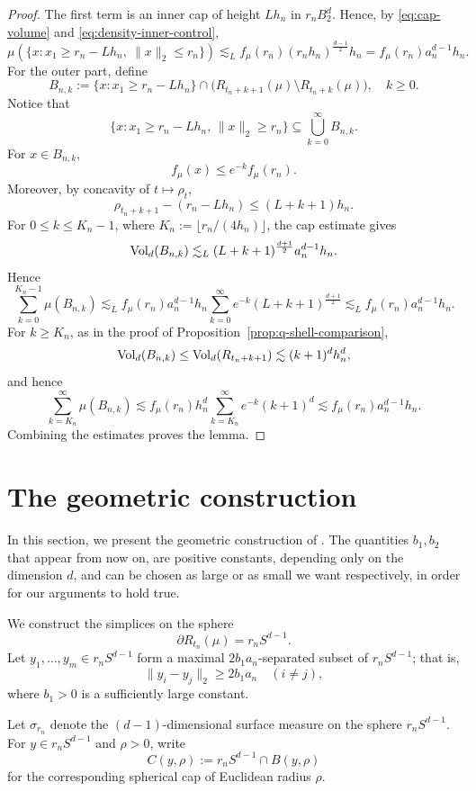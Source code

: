 \documentclass[10pt]{amsart}
\newcommand{\1}{\textbf{1}}
\newcommand{\vol}{{\rm Vol}}
\numberwithin{equation}{section} %
\theoremstyle{remark}
\theoremstyle{definition}
\begin{document}
\begin{proof}
The first term is an inner cap of height \(Lh_n\) in \(r_nB_2^d\). Hence, by \eqref{eq:cap-volume} and \eqref{eq:density-inner-control},
\[
\mu(\{x:x_1\ge r_n-Lh_n,\ \|x\|_2\le r_n\})
\lesssim_L
f_\mu(r_n)(r_nh_n)^{\frac{d-1}{2}}h_n
=
f_\mu(r_n)a_n^{d-1}h_n.
\]
For the outer part, define
\[
B_{n,k}:=
\{x:x_1\ge r_n-Lh_n\}
\cap
\bigl(R_{t_n+k+1}(\mu)\setminus R_{t_n+k}(\mu)\bigr),
\quad k\ge0.
\]
Notice that 
\[
\{x: x_1\geq r_n-L h_n, \, \|x\|_2 \geq r_n\} \subseteq \bigcup_{k=0}^{\infty} B_{n,k}.
\]
For \(x\in B_{n,k}\),
\[
f_\mu(x)\le e^{-k}f_\mu(r_n).
\]
Moreover, by concavity of \(t\mapsto\rho_t\),
\[
\rho_{t_n+k+1}-(r_n-Lh_n)
\le
(L+k+1)h_n.
\]
For $0\le k\le K_n-1$, where $K_n:=\lfloor r_n/(4h_n)\rfloor$, the cap estimate gives
\[
\vol_d(B_{n,k})
\lesssim_L
(L+k+1)^{\frac{d+1}{2}}a_n^{d-1}h_n.
\]
Hence
\[
\sum_{k=0}^{K_n-1}\mu(B_{n,k})
\lesssim_L
f_\mu(r_n)a_n^{d-1}h_n
\sum_{k=0}^{\infty}e^{-k}(L+k+1)^{\frac{d+1}{2}}
\lesssim_L
f_\mu(r_n)a_n^{d-1}h_n.
\]
For \(k \geq K_n\), as in the proof of Proposition~\ref{prop:q-shell-comparison},
\[
\vol_d(B_{n,k}) \leq \vol_d(R_{t_{n}+k+1})
\lesssim
(k+1)^dh_n^d,
\]
and hence
\[
\sum_{k=K_n}^{\infty}\mu(B_{n,k})
\lesssim
f_\mu(r_n)h_n^d\sum_{k=K_n}^{\infty}e^{-k}(k+1)^d \lesssim f_\mu(r_n)a_n^{d-1}h_n.
\]
Combining the estimates proves the lemma.
\end{proof}




\section{The geometric construction}

In this section, we present the geometric construction of \cite{Bar-Vu}. The quantities $b_1,b_2$ that appear from now on, are positive constants, depending only on the dimension $d$, and can be chosen as large or as small we want respectively, in order for our arguments to hold true.

We construct the simplices on the sphere
\[
\partial R_{t_n}(\mu)=r_nS^{d-1}.
\]
Let \(y_1,\ldots,y_m\in r_nS^{d-1}\) form a maximal $2b_1a_n$-separated subset of $r_nS^{d-1}$; that is,
\[
\|y_i-y_j\|_2\ge 2b_1 a_n
\quad (i\neq j),
\]
where \(b_1>0\) is a sufficiently large constant. 

Let \(\sigma_{r_n}\) denote the \((d-1)\)-dimensional surface measure on the sphere
$r_nS^{d-1}$. For \(y\in r_nS^{d-1}\) and \(\rho>0\), write
\[
C(y,\rho):=r_nS^{d-1}\cap B(y,\rho)
\]
for the corresponding spherical cap of Euclidean radius \(\rho\).
\end{document}
